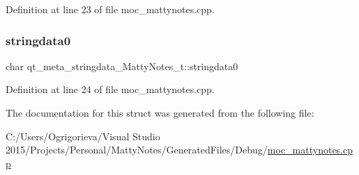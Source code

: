 Definition at line 23 of file moc\+\_\+mattynotes.\+cpp.

\hypertarget{structqt__meta__stringdata__MattyNotes__t_aefec099c932333985b581afe6840c1d4}{}\label{structqt__meta__stringdata__MattyNotes__t_aefec099c932333985b581afe6840c1d4} 
\subsubsection{\texorpdfstring{stringdata0}{stringdata0}}
{\footnotesize\ttfamily char qt\+\_\+meta\+\_\+stringdata\+\_\+\+Matty\+Notes\+\_\+t\+::stringdata0}



Definition at line 24 of file moc\+\_\+mattynotes.\+cpp.



The documentation for this struct was generated from the following file\+:\begin{DoxyCompactItemize}
\item 
C\+:/\+Users/\+Ogrigorieva/\+Visual Studio 2015/\+Projects/\+Personal/\+Matty\+Notes/\+Generated\+Files/\+Debug/\hyperlink{Debug_2moc__mattynotes_8cpp}{moc\+\_\+mattynotes.\+cpp}\end{DoxyCompactItemize}
